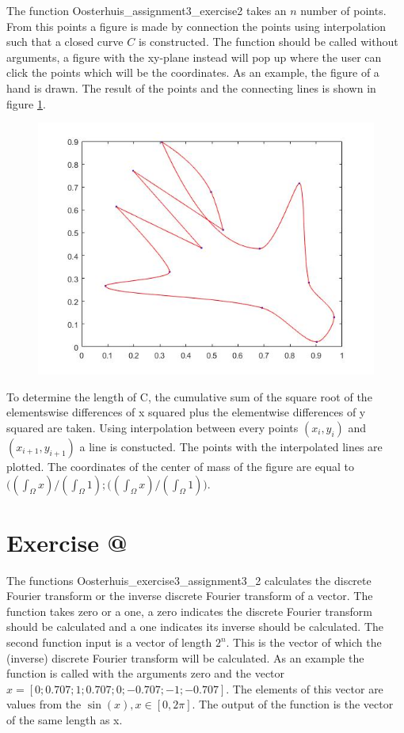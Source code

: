 \documentclass[12pt]{article}
\makeatletter
\newcommand*{\rom}[1]{\expandafter\@slowromancap\romannumeral #1@}
\makeatother
\begin{document}
The function Oosterhuis\_assignment3\_exercise2 takes an $n$ number of points. From this points a figure is made by connection the points using interpolation such that a closed curve $C$ is constructed. The function should be called without arguments, a figure with the xy-plane instead will pop up where the user can click the points which will be the coordinates. As an example, the figure of a hand is drawn. The result of the points and the connecting lines is shown in figure \ref{ex2_1}.
\begin{figure}[H]
\centering
\includegraphics[width=0.6\linewidth,natwidth=610,natheight=642]{ex2_hand.jpg}
\caption{}
\label{ex2_1}
\end{figure}

To determine the length of C, the cumulative sum of the square root of the elementswise differences of x squared plus the elementwise differences of y squared are taken. Using interpolation between every points $(x_i,y_i)$ and  $(x_{i+1},y_{i+1})$ a line is constucted. The points with the interpolated lines are plotted. The coordinates of the center of mass of the figure are equal to $\bigl((\int_{\Omega}x) / (\int_{\Omega}1); ((\int_{\Omega}x) / (\int_{\Omega}1)\bigr)$.



\section*{Exercise \rom{3}}

The functions Oosterhuis\_exercise3\_assignment3\_2 calculates the discrete Fourier transform or the inverse discrete Fourier transform of a vector. The function takes zero or a one, a zero indicates the discrete Fourier transform should be calculated and  a one indicates its inverse should be calculated. The second function input is a vector of length $2^n$. This is the vector of which the (inverse) discrete Fourier transform will be calculated. As an example the function is called with the arguments zero and the vector $x = [0;0.707;1;0.707;0;-0.707;-1;-0.707]$. The elements of this vector are values from the $\sin(x), x\in[0,2\pi]$. The output of the function is the vector of the same length as x.
\end{document}

